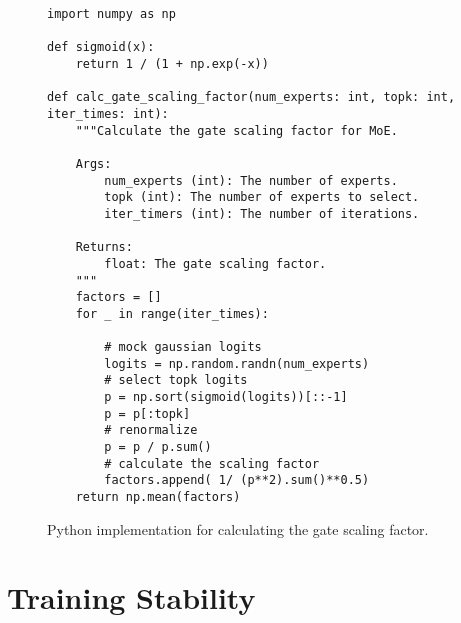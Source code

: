 
\begin{figure}[h]
\begin{lstlisting}[frame=single,breaklines=false]
import numpy as np

def sigmoid(x):
    return 1 / (1 + np.exp(-x))

def calc_gate_scaling_factor(num_experts: int, topk: int, iter_times: int):
    """Calculate the gate scaling factor for MoE.

    Args:
        num_experts (int): The number of experts.
        topk (int): The number of experts to select.
        iter_timers (int): The number of iterations.

    Returns:
        float: The gate scaling factor.
    """
    factors = []
    for _ in range(iter_times):

        # mock gaussian logits
        logits = np.random.randn(num_experts)
        # select topk logits
        p = np.sort(sigmoid(logits))[::-1]
        p = p[:topk]
        # renormalize
        p = p / p.sum()
        # calculate the scaling factor
        factors.append( 1/ (p**2).sum()**0.5)
    return np.mean(factors)
\end{lstlisting}
\caption{Python implementation for calculating the gate scaling factor.}
\label{fig:gate_scaling_code}
\end{figure}

\section{Training Stability}
\label{sec:appendix:stability}

